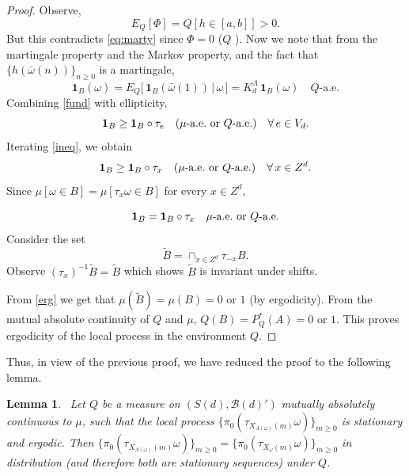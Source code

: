 \documentclass[final]{aomart}
\def\mathscr#1{#1}%
\def\mathbb#1{#1}%
\theoremstyle{plain}
\newtheorem{lemma}[theorem]{Lemma}
\theoremstyle{definition}
\theoremstyle{remark}
\begin{document}
\begin{proof}
Observe, 
\[
\mathbb{E}_{\mathbb{Q}} [\Phi] = \mathbb{Q}[h \in [a,b]]>0.
\]
But this contradicts \ref{eq:marty} since $\Phi =0 $ ($\mathbb{Q}$ ).
Now we note that from the martingale property and the Markov property, and the fact that $\{h(\bar{\omega}(n))\}_{n\geq0}$ is a martingale,
\begin{equation}\label{fund}
\boldsymbol{1}_{B}(\omega) 
  = \mathbb{E}_{\mathbb{Q}}\Big[\,\boldsymbol{1}_{B}(\bar{\omega}(1)) \,\big|\, \omega \,\Big]
  = K_d^{\Lambda} \,\boldsymbol{1}_{B}(\omega)
  \quad \mathbb{Q}\text{-a.e.}
\end{equation}
Combining \ref{fund} with ellipticity,
\begin{equation}{\label{ineq}}
\boldsymbol{1}_{B} \geq \boldsymbol{1}_{B} \circ \tau_e \quad (\mu\text{-\text{a.e.} or } \mathbb{Q}\text{-a.e.}) \quad \forall\, e \in {V}_d.
\end{equation}
Iterating \ref{ineq}, we obtain  
\[
\boldsymbol{1}_{B} \geq \boldsymbol{1}_{B} \circ \tau_x \quad (\mu\text{\text{-a.e.} or } \mathbb{Q}\text{\text{-a.e.}}) \quad \forall\, x \in \mathbb{Z}^d.
\]
Since $\mu[ \omega \in B] = \mu [\tau_{x}\omega\in B]$ for every $x \in \mathbb{Z}^d$, 

\begin{equation}{\label{erg}}
 \boldsymbol{1}_{B} = \boldsymbol{1}_{B} \circ \tau_x \quad \mu\text{\text{-a.e.} or}~\mathbb{Q}\text{\text{-a.e.}}
\end{equation}
Consider the set \[
\tilde{B} = \cap_{x \in \mathbb{Z}^d} \tau_{-x}B .
\] 
Observe $(\tau_x)^{-1} \tilde{B} = \tilde{B}$ which shows $\tilde{B}$ is invariant under shifts. 

From \ref{erg} we get that $ \mu(\tilde{B})= \mu(B) = 0$ or $1$ (by ergodicity). From the mutual absolute continuity of $\mathbb{Q}$ and $ \mu$, 
$\mathbb{Q}(B) =P^*_{\mathbb{Q}}(A)=0$ or $1$. This proves ergodicity of the local process in the environment $\mathbb{Q}$.
\end{proof}
Thus, in view of the previous proof, we have reduced the proof to the following lemma. 
\begin{lemma}~\label{Final}
    Let $\mathbb{Q}$ be a measure on $(\mathscr{S}(d), \mathcal{B}(d)')$ mutually absolutely continuous to
   $\mu$, such that the local process $\{\pi_0(\tau_{X_{\Lambda(\omega)}(m)}\omega)\}_{m \geq 0}$ is stationary and ergodic. Then $\{\pi_0(\tau_{X_{\Lambda(\omega)}(m)}\omega)\}_{m \geq 0}=\{\pi_0(\tau_{X_{\omega}(m)}\omega)\}_{m \geq 0}$ in distribution (and therefore both are stationary sequences) under $\mathbb{Q}$.
\end{lemma}
\end{document}
